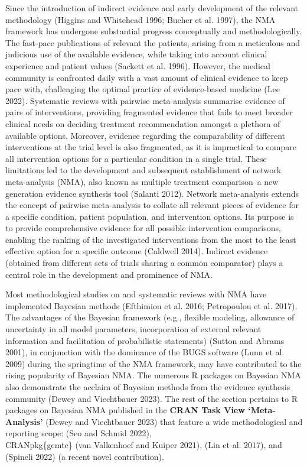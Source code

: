 Since the introduction of indirect evidence and early development of the relevant
methodology (Higgins and Whitehead 1996; Bucher et al. 1997), the NMA framework has undergone substantial
progress conceptually and methodologically. The fast-pace publications of relevant
the patients, arising from a meticulous and judicious use of the available evidence,
while taking into account clinical experience and patient values (Sackett et al. 1996).
However, the medical community is confronted daily with a vast amount of clinical
evidence to keep pace with, challenging the optimal practice of evidence-based
medicine (Lee 2022). Systematic reviews with pairwise meta-analysis summarise evidence
of pairs of interventions, providing fragmented evidence that fails to meet broader
clinical needs on deciding treatment recommendation amongst a plethora of available
options. Moreover, evidence regarding the comparability of different interventions
at the trial level is also fragmented, as it is impractical to compare all intervention
options for a particular condition in a single trial. These limitations led to the
development and subsequent establishment of network meta-analysis (NMA), also known
as multiple treatment comparison--a new generation evidence synthesis tool (Salanti 2012).
Network meta-analysis extends the concept of pairwise meta-analysis to collate all
relevant pieces of evidence for a specific condition, patient population, and
intervention options. Its purpose is to provide comprehensive evidence for all possible
intervention comparisons, enabling the ranking of the investigated interventions
from the most to the least effective option for a specific outcome (Caldwell 2014).
Indirect evidence (obtained from different sets of trials sharing a common comparator)
plays a central role in the development and prominence of NMA.

Most methodological studies on and systematic reviews with NMA have implemented
Bayesian methods (Efthimiou et al. 2016; Petropoulou et al. 2017). The advantages of the Bayesian
framework (e.g., flexible modeling, allowance of uncertainty in all model parameters,
incorporation of external relevant information and facilitation of probabilistic
statements) (Sutton and Abrams 2001), in conjunction with the dominance of the BUGS software
(Lunn et al. 2009) during the springtime of the NMA framework, may have contributed to
the rising popularity of Bayesian NMA. The numerous R packages on Bayesian NMA
also demonstrate the acclaim of Bayesian methods from the evidence synthesis
community (Dewey and Viechtbauer 2023). The rest of the section pertains to R packages on
Bayesian NMA published in the \textbf{CRAN Task View `Meta-Analysis'} (Dewey and Viechtbauer 2023)
that feature a wide methodological and reporting scope:  (Seo and Schmid 2022),\\
CRANpkg\{gemtc\} (van Valkenhoef and Kuiper 2021),  (Lin et al. 2017), and 
(Spineli 2022) (a recent novel contribution).

